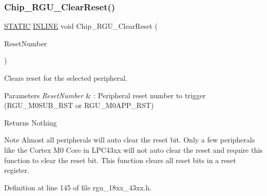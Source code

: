 \subsubsection{\texorpdfstring{Chip\+\_\+\+R\+G\+U\+\_\+\+Clear\+Reset()}{Chip\_RGU\_ClearReset()}}
{\footnotesize\ttfamily \hyperlink{group___l_p_c___types___public___macros_ga10b2d890d871e1489bb02b7e70d9bdfb}{S\+T\+A\+T\+IC} \hyperlink{spifi__18xx__43xx_8h_a2eb6f9e0395b47b8d5e3eeae4fe0c116}{I\+N\+L\+I\+NE} void Chip\+\_\+\+R\+G\+U\+\_\+\+Clear\+Reset (\begin{DoxyParamCaption}\item[{\hyperlink{group___r_g_u__18_x_x__43_x_x_gaf76b0dbb78e73bbcd44948364417ae60}{C\+H\+I\+P\+\_\+\+R\+G\+U\+\_\+\+R\+S\+T\+\_\+T}}]{Reset\+Number }\end{DoxyParamCaption})}



Clears reset for the selected peripheral. 


\begin{DoxyParams}{Parameters}
{\em Reset\+Number} & \+: Peripheral reset number to trigger (R\+G\+U\+\_\+\+M0\+S\+U\+B\+\_\+\+R\+ST or R\+G\+U\+\_\+\+M0\+A\+P\+P\+\_\+\+R\+ST) \\
\hline
\end{DoxyParams}
\begin{DoxyReturn}{Returns}
Nothing 
\end{DoxyReturn}
\begin{DoxyNote}{Note}
Almost all peripherals will auto clear the reset bit. Only a few peripherals like the Cortex M0 Core in L\+P\+C43xx will not auto clear the reset and require this function to clear the reset bit. This function clears all reset bits in a reset register. 
\end{DoxyNote}


Definition at line 145 of file rgu\+\_\+18xx\+\_\+43xx.\+h.

\mbox{\label{group___r_g_u__18_x_x__43_x_x_gabada148b5dec002cb3e8a748e6613194}} 
